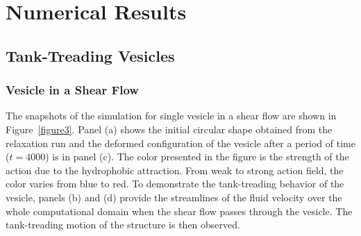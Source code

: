 \documentclass[lineno]{jfm}
\begin{document}


\section{\label{results}Numerical Results}

\subsection{Tank-Treading Vesicles}

\subsubsection{Vesicle in a Shear Flow}

The snapshots of the simulation for single vesicle in a shear flow are shown in Figure~\ref{figure3}.
Panel (a) shows the initial circular shape obtained from the relaxation run and the deformed 
configuration of the vesicle after a period of time ($t=4000$) is in panel (c). The color presented in the figure 
is the strength of the action due to the hydrophobic attraction. From weak to strong action field, the color
varies from blue to red.
To demonstrate the tank-treading behavior of the vesicle, panels (b) and (d) provide the streamlines of the 
fluid velocity over the whole computational domain when the shear flow passes through the vesicle. The tank-treading motion of the structure is then observed.

\end{document}

